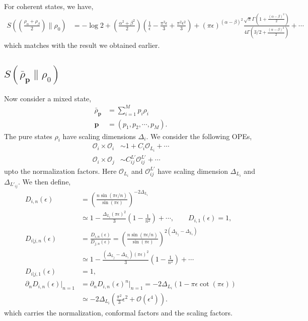 \documentclass[11pt]{article}
\newcommand{\ep}{\epsilon}
\newcommand{\p}{\partial}
\newcommand{\mO}{\mathcal{O}}
\newcommand{\lb}{\left(}
\newcommand{\rb}{\right)}
\begin{document}
For coherent states, we have,
\begin{align}
    S\lb \lb\frac{\rho_\alpha + \rho_\beta}{2}\rb\Big\| \rho_0\rb &= -\log 2+ \lb\frac{\alpha^2 + \beta^2}{2}\rb \lb\frac{1}{\ep} - \frac{\pi^2\ep}{3} + \frac{\pi^2\ep^2}{3} \rb + \lb\pi \ep\rb^{(\alpha-\beta)^2} \frac{\sqrt \pi \Gamma\lb1+\frac{(\alpha-\beta)^2}{2}\rb}{4\Gamma\lb3/2 + \frac{(\alpha-\beta)^2}{2}\rb}+\cdots
\end{align}
which matches with the result we obtained earlier.

\subsection{\texorpdfstring{$S(\bar{\rho}_\textbf{p}\| \rho_0)$}{S rho bar wrt vacuum}}
Now consider a mixed state, 
\begin{align}
    \bar{\rho}_\textbf{p} &= \sum_{i=1}^M p_i \rho_i \\
    \textbf{p}&= (p_1,p_2,\cdots, p_M).
\end{align}
The pure states $\rho_i$ have scaling dimensions $\Delta_i$. We consider the following OPEs,
\begin{align}
    \mO_i \times \mO_i &\sim 1+ C_i \mO_{L_i} +\cdots \\
    \mO_i \times \mO_j &\sim C_{ij}^{L'} \mO_{ij}^{L'} + \cdots
\end{align}
upto the normalization factors. Here $\mO_{L_i}$ and $\mO_{ij}^{L'}$ have scaling dimension $\Delta_{L_i}$ and $\Delta_{L'_{ij}}$. We then define,
\begin{align}
    D_{i,n}(\ep) &= \lb\frac{n\sin (\pi\ep/n)}{\sin(\pi\ep)}\rb^{-2\Delta_{L_i}} \\
    &\simeq 1-\frac{\Delta_{L_i}(\pi \ep)^2}{3}\lb 1-\frac{1}{n^2}\rb+\cdots 
    ,\qquad D_{i,1}(\ep)=1, \\
    D_{i|j,n}(\ep)&= \frac{D_{i,n}(\ep)}{D_{j,n}(\ep)} =  \lb\frac{n\sin (\pi\ep/n)}{\sin(\pi\ep)}\rb^{2(\Delta_{L_j}-\Delta_{L_i})} \\
    &\simeq 1-\frac{\lb \Delta_{L_j}-\Delta_{L_i}\rb(\pi \ep)^2}{3}\lb 1-\frac{1}{n^2}\rb+\cdots 
    \\
    D_{i|j,1}(\ep)&=1, \\
    \p_n D_{i,n}(\ep)\big|_{n=1} &= \p_n D_{i,n}(\ep)^n\big|_{n=1}=-2\Delta_{L_i} \lb 1-\pi \ep\cot (\pi\ep)\rb \\
    &\simeq -2\Delta_{L_i}\lb\frac{\pi^2}{3}\ep^2 + \mO(\ep^4)\rb.
\end{align}
which carries the normalization, conformal factors and the scaling factors. 
\end{document}
